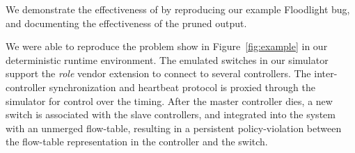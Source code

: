 We demonstrate the effectiveness of \simulator{} by reproducing our example Floodlight
bug, and documenting the effectiveness of the pruned output.

We were able to reproduce the problem show in Figure~\ref{fig:example} in our deterministic runtime environment. The
emulated switches in our simulator support the \emph{role} vendor extension to
connect to several controllers. The inter-controller synchronization and heartbeat
protocol is proxied through the simulator for control over the timing. After the
master controller dies, a new switch is associated with the slave controllers, and
integrated into the system with an unmerged flow-table, resulting in a persistent
policy-violation between the flow-table representation in the controller and the switch.

